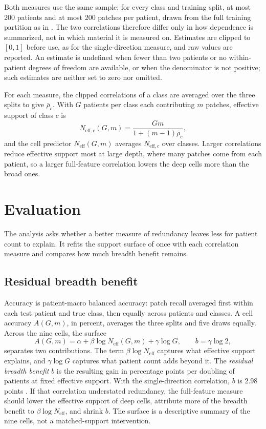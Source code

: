 \documentclass[11pt]{article}
\newcommand{\Neff}{N_{\mathrm{eff}}}
\newcommand{\Neffc}{N_{\mathrm{eff},c}}
\begin{document}
Both measures use the same sample: for every class and training split, at most 200 patients and at most 200 patches per patient, drawn from the full training partition as in \citet{queisler2026effectiveSupport}. The two correlations therefore differ only in how dependence is summarized, not in which material it is measured on. Estimates are clipped to $[0,1]$ before use, as for the single-direction measure, and raw values are reported. An estimate is undefined when fewer than two patients or no within-patient degrees of freedom are available, or when the denominator is not positive; such estimates are neither set to zero nor omitted.

For each measure, the clipped correlations of a class are averaged over the three splits to give $\bar\rho_c$. With $G$ patients per class each contributing $m$ patches, effective support of class $c$ is
\begin{equation}
 \Neffc(G,m)=\frac{Gm}{1+(m-1)\bar\rho_c},
 \label{eq:neff}
\end{equation}
\noindent and the cell predictor $\Neff(G,m)$ averages $\Neffc$ over classes. Larger correlations reduce effective support most at large depth, where many patches come from each patient, so a larger full-feature correlation lowers the deep cells more than the broad ones.

\section{Evaluation}
\label{sec:evaluation}
The analysis asks whether a better measure of redundancy leaves less for patient count to explain. It refits the support surface of \citet{queisler2026effectiveSupport} once with each correlation measure and compares how much breadth benefit remains.

\subsection{Residual breadth benefit}
\label{sec:residual}
Accuracy is patient-macro balanced accuracy: patch recall averaged first within each test patient and true class, then equally across patients and classes. A cell accuracy $A(G,m)$, in percent, averages the three splits and five draws equally. Across the nine cells, the surface
\begin{equation}
 A(G,m)=\alpha+\beta\log\Neff(G,m)+\gamma\log G,
 \qquad b=\gamma\log 2,
 \label{eq:surface}
\end{equation}
\noindent separates two contributions. The term $\beta\log\Neff$ captures what effective support explains, and $\gamma\log G$ captures what patient count adds beyond it. The \emph{residual breadth benefit} $b$ is the resulting gain in percentage points per doubling of patients at fixed effective support. With the single-direction correlation, $b$ is 2.98 points \citep{queisler2026effectiveSupport}. If that correlation understated redundancy, the full-feature measure should lower the effective support of deep cells, attribute more of the breadth benefit to $\beta\log\Neff$, and shrink $b$. The surface is a descriptive summary of the nine cells, not a matched-support intervention.
\end{document}
